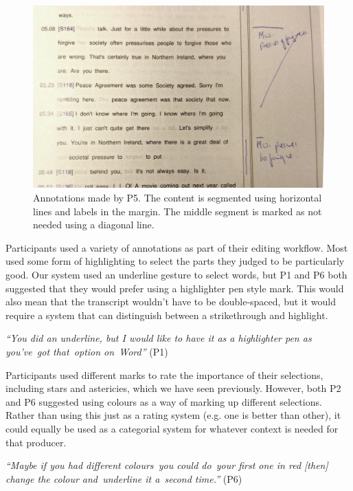 
\begin{figure}[h]
  \centering
  \includegraphics[width=\columnwidth]{figs/pen-annotations-p5-cropped.jpg}
  \caption{Annotations made by P5. The content is segmented using horizontal lines and labels in the margin. The
  middle segment is marked as not needed using a diagonal line.}
  \label{fig:p5-annotations}
\end{figure}


Participants used a variety of annotations as part of their editing workflow. Most used some form of highlighting to
select the parts they judged to be particularly good. Our system used an underline gesture to select words, but P1 and
P6 both suggested that they would prefer using a highlighter pen style mark.  This would also mean that the transcript
wouldn't have to be double-spaced, but it would require a system that can distinguish between a strikethrough and
highlight.

\textit{``You did an underline, but I would like to have it as a highlighter pen as you've got that option on Word''}
(P1)

Participants used different marks to rate the importance of their selections, including stars and astericies, which we
have seen previously. However, both P2 and P6 suggested using colours as a way of marking up different selections.
Rather than using this just as a rating system (e.g. one is better than other), it could equally be used as a
categorial system for whatever context is needed for that producer.

\textit{``Maybe if you had different colours you could do your first one in red [then]
change the colour and underline it a second time.''} (P6)


